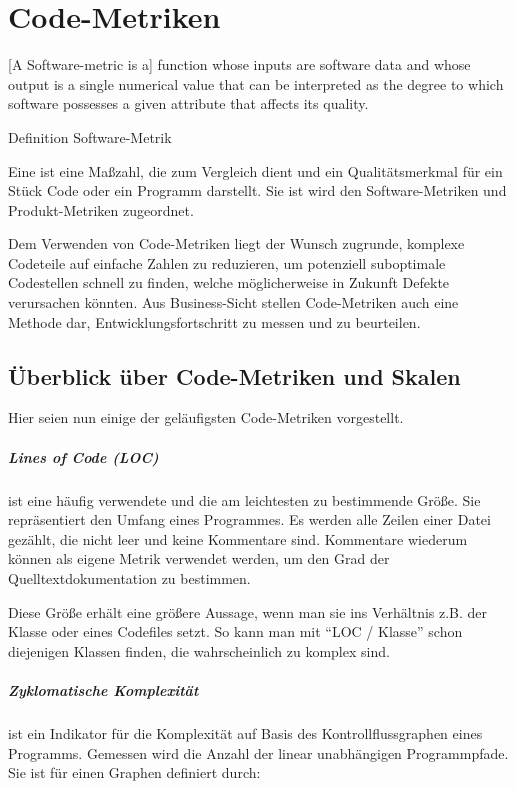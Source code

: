 \chapter{Code-Metriken}
\label{sec:metriken}
\epigraph{[A Software-metric is a] function whose inputs are software data and whose output is a single
numerical value that can be interpreted as the degree to which software possesses a given attribute that affects its quality.}{Definition Software-Metrik \citep{ieee_1998}}

Eine  ist eine Maßzahl, die zum Vergleich dient und ein Qualitätsmerkmal für ein Stück Code oder ein Programm darstellt. Sie ist wird den Software-Metriken und Produkt-Metriken zugeordnet.

Dem Verwenden von Code-Metriken liegt der Wunsch zugrunde, komplexe Codeteile auf einfache Zahlen zu reduzieren, um potenziell suboptimale Codestellen schnell zu finden, welche möglicherweise in Zukunft Defekte verursachen könnten. Aus Business-Sicht stellen Code-Metriken auch eine Methode dar, Entwicklungsfortschritt zu messen und zu beurteilen.
\section{Überblick über Code-Metriken und Skalen}
Hier seien nun einige der geläufigsten Code-Metriken vorgestellt.
\paragraph{Lines of Code (LOC)} ist eine häufig verwendete und die am leichtesten zu bestimmende Größe. Sie repräsentiert den Umfang eines Programmes. Es werden alle Zeilen einer Datei gezählt, die nicht leer und keine Kommentare sind. Kommentare wiederum können als eigene Metrik verwendet werden, um den Grad der Quelltextdokumentation zu bestimmen.

Diese Größe erhält eine größere Aussage, wenn man sie ins Verhältnis z.B. der Klasse oder eines Codefiles setzt. So kann man mit "`LOC / Klasse"' schon diejenigen Klassen finden, die wahrscheinlich zu komplex sind. \\

\paragraph{Zyklomatische Komplexität} ist ein Indikator für die Komplexität auf Basis des Kontrollflussgraphen eines Programms. Gemessen wird die Anzahl der linear unabhängigen Programmpfade. Sie ist für einen Graphen definiert durch:

